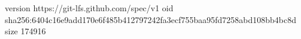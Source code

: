 version https://git-lfs.github.com/spec/v1
oid sha256:6404c16e9add170e6f485b412797242fa3ecf755baa95fd7258abd108bb4bc8d
size 174916

